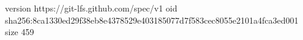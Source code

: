 version https://git-lfs.github.com/spec/v1
oid sha256:8ca1330ed29f38eb8e4378529e403185077d7f583cec8055e2101a4fca3ed001
size 459
